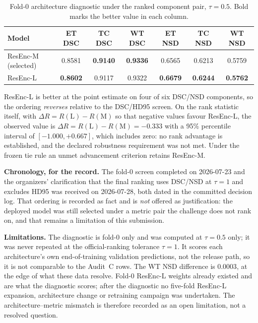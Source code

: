 \documentclass[runningheads]{llncs}
\begin{document}
\begin{table}[htbp]\centering
\caption{Fold-0 architecture diagnostic under the ranked component pair, $\tau=0.5$. Bold marks the
better value in each column.}
\begin{tabular}{@{}lcccccc@{}}
\toprule
Model & ET DSC & TC DSC & WT DSC & ET NSD & TC NSD & WT NSD \\
\midrule
ResEnc-M (selected) & 0.8581 & \textbf{0.9140} & \textbf{0.9336} & 0.6565 & 0.6213 & 0.5759 \\
ResEnc-L            & \textbf{0.8602} & 0.9117 & 0.9322 & \textbf{0.6679} & \textbf{0.6244} & \textbf{0.5762} \\
\bottomrule
\end{tabular}
\end{table}

ResEnc-L is better at the point estimate on four of six DSC/NSD components, so the ordering
\emph{reverses} relative to the DSC/HD95 screen. On the rank statistic itself, with
$\Delta R = R(\mathrm{L})-R(\mathrm{M})$ so that negative values favour ResEnc-L, the observed value
is $\Delta R = R(\mathrm{L})-R(\mathrm{M}) = -0.333$ with a 95\% percentile interval of
$[-1.000,+0.667]$, which includes zero: no rank advantage is established, and the declared robustness
requirement was not met. Under the frozen tie rule an unmet advancement criterion retains ResEnc-M.

\medskip\noindent\textbf{Chronology, for the record.} The fold-0 screen completed on 2026-07-23 and
the organizers' clarification that the final ranking uses DSC/NSD at $\tau=1$ and excludes HD95 was
received on 2026-07-28, both dated in the committed decision log. That ordering is recorded as fact
and is \emph{not} offered as justification: the deployed model was still selected under a metric pair
the challenge does not rank on, and that remains a limitation of this submission.

\medskip\noindent\textbf{Limitations.} The diagnostic is fold-0 only and was computed at $\tau=0.5$
only; it was never repeated at the official-ranking tolerance $\tau=1$. It scores each architecture's
own end-of-training validation predictions, not the release path, so it is not comparable to the
Audit~C rows. The WT NSD difference is $0.0003$, at the edge of what these data resolve. Fold-0
ResEnc-L weights already existed and are what the diagnostic scores; after the diagnostic no
five-fold ResEnc-L expansion, architecture change or retraining campaign was undertaken. The
architecture--metric mismatch is therefore recorded as an open limitation, not a resolved question.
\end{document}
